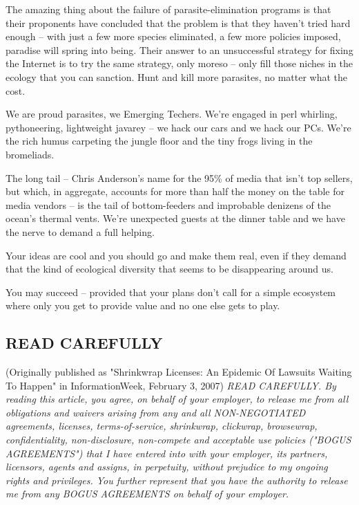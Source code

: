 The amazing thing about the failure of parasite-elimination
programs is that their proponents have concluded that the problem
is that they haven't tried hard enough -- with just a few more
species eliminated, a few more policies imposed, paradise will
spring into being. Their answer to an unsuccessful strategy for
fixing the Internet is to try the same strategy, only moreso --
only fill those niches in the ecology that you can sanction. Hunt
and kill more parasites, no matter what the cost.

We are proud parasites, we Emerging Techers. We're engaged in perl
whirling, pythoneering, lightweight javarey -- we hack our cars and
we hack our PCs. We're the rich humus carpeting the jungle floor
and the tiny frogs living in the bromeliads.

The long tail -- Chris Anderson's name for the 95\% of media that
isn't top sellers, but which, in aggregate, accounts for more than
half the money on the table for media vendors -- is the tail of
bottom-feeders and improbable denizens of the ocean's thermal
vents. We're unexpected guests at the dinner table and we have the
nerve to demand a full helping.

Your ideas are cool and you should go and make them real, even if
they demand that the kind of ecological diversity that seems to be
disappearing around us.

You may succeed -- provided that your plans don't call for a simple
ecosystem where only you get to provide value and no one else gets
to play.

\subsection{READ CAREFULLY}

(Originally published as "Shrinkwrap Licenses: An Epidemic Of
Lawsuits Waiting To Happen" in InformationWeek, February 3, 2007)
\emph{READ CAREFULLY. By reading this article, you agree, on behalf of your employer, to release me from all obligations and waivers arising from any and all NON-NEGOTIATED agreements, licenses, terms-of-service, shrinkwrap, clickwrap, browsewrap, confidentiality, non-disclosure, non-compete and acceptable use policies ("BOGUS AGREEMENTS") that I have entered into with your employer, its partners, licensors, agents and assigns, in perpetuity, without prejudice to my ongoing rights and privileges. You further represent that you have the authority to release me from any BOGUS AGREEMENTS on behalf of your employer.}

